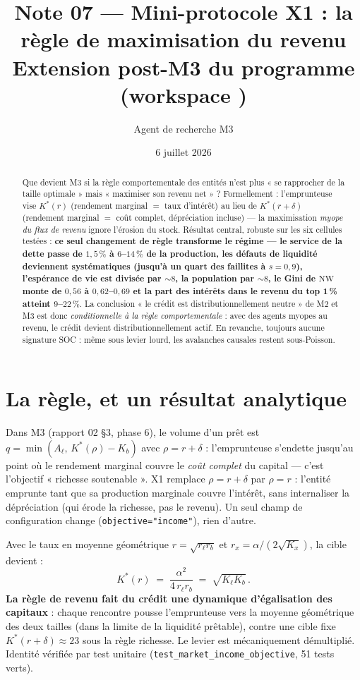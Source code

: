 \documentclass[11pt,a4paper]{article}
\title{Note 07 — Mini-protocole X1 : la règle de maximisation du revenu\\
\large Extension post-M3 du programme (workspace \code{m3\_credit\_soc})}
\author{Agent de recherche M3}
\date{6 juillet 2026}
\newcommand{\NW}{\mathrm{NW}}
\newcommand{\code}[1]{\texttt{#1}}
\begin{document}
\maketitle

\begin{abstract}
Que devient M3 si la règle comportementale des entités n'est plus « se
rapprocher de la taille optimale » mais « maximiser son revenu net » ?
Formellement : l'emprunteuse vise $K^*(r)$ (rendement marginal $=$ taux
d'intérêt) au lieu de $K^*(r+\delta)$ (rendement marginal $=$ coût complet,
dépréciation incluse) — la maximisation \emph{myope du flux de revenu}
ignore l'érosion du stock. Résultat central, robuste sur les six cellules
testées : \textbf{ce seul changement de règle transforme le régime — le
service de la dette passe de $1{,}5\,\%$ à $6$--$14\,\%$ de la production,
les défauts de liquidité deviennent systématiques (jusqu'à un quart des
faillites à $s{=}0{,}9$), l'espérance de vie est divisée par $\sim 8$, la
population par $\sim 8$, le Gini de $\NW$ monte de $0{,}56$ à
$0{,}62$--$0{,}69$ et la part des intérêts dans le revenu du top 1\,\%
atteint $9$--$22\,\%$}. La conclusion « le crédit est distributionnellement
neutre » de M2 et M3 est donc \emph{conditionnelle à la règle
comportementale} : avec des agents myopes au revenu, le crédit devient
distributionnellement actif. En revanche, toujours aucune signature SOC :
même sous levier lourd, les avalanches causales restent sous-Poisson.
\end{abstract}

\section{La règle, et un résultat analytique}

Dans M3 (rapport 02 §3, phase 6), le volume d'un prêt est
$q = \min(A_\ell,\, K^*(\rho) - K_b)$ avec $\rho = r + \delta$ : l'emprunteuse
s'endette jusqu'au point où le rendement marginal couvre le \emph{coût
complet} du capital — c'est l'objectif « richesse soutenable ». X1 remplace
$\rho = r + \delta$ par $\rho = r$ : l'entité emprunte tant que sa production
marginale couvre l'intérêt, sans internaliser la dépréciation (qui érode la
richesse, pas le revenu). Un seul champ de configuration change
(\code{objective="income"}), rien d'autre.

Avec le taux en moyenne géométrique $r = \sqrt{r_\ell r_b}$ et
$r_x = \alpha/(2\sqrt{K_x})$, la cible devient :
\[
K^*(r) \;=\; \frac{\alpha^2}{4\,r_\ell r_b} \;=\; \sqrt{K_\ell K_b}\,.
\]
\textbf{La règle de revenu fait du crédit une dynamique d'égalisation des
capitaux} : chaque rencontre pousse l'emprunteuse vers la moyenne géométrique
des deux tailles (dans la limite de la liquidité prêtable), contre une cible
fixe $K^*(r+\delta) \approx 23$ sous la règle richesse. Le levier est
mécaniquement démultiplié. Identité vérifiée par test unitaire
(\code{test\_market\_income\_objective}, 51 tests verts).
\end{document}
